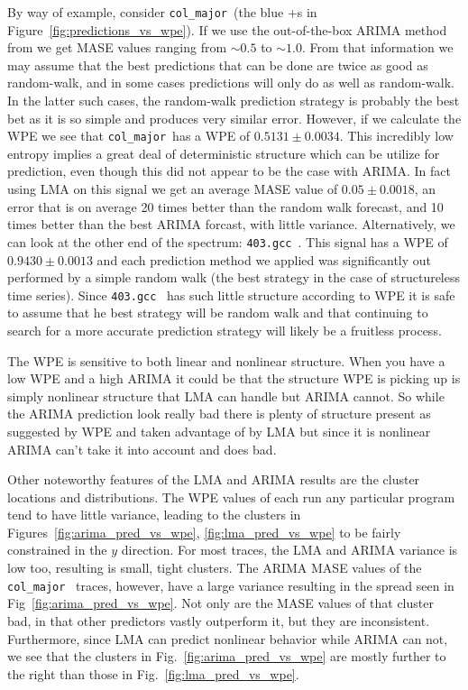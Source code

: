 \documentclass{article}
\newcommand{\gcc}{{\tt 403.gcc}~}
\newcommand{\col}{{\tt col\_major}~}
\begin{document}
By way of example, consider \col (the blue +s in
Figure~\ref{fig:predictions_vs_wpe}). If we use the out-of-the-box ARIMA method
from \cite{ARIMA-autofit} we get MASE values ranging from $\sim0.5$ to
$\sim1.0$. From that information we may assume that the best predictions that
can be done are twice as good as random-walk, and in some cases predictions will
only do as well as random-walk. In the latter such cases, the random-walk
prediction strategy is probably the best bet as it is so simple and produces
very similar error. However, if we calculate the WPE we see that \col has a WPE
of $0.5131 \pm 0.0034$. This incredibly low entropy implies a great deal of
deterministic structure which can be utilize for prediction, even though this
did not appear to be the case with ARIMA. In fact using LMA on this signal we
get an average MASE value of $0.05\pm0.0018$, an error that is on average 20
times better than the random walk forecast, and 10 times better than the best
ARIMA forcast, with little variance. Alternatively, we can look at the other end
of the spectrum: \gcc. This signal has a WPE of $0.9430\pm0.0013$ and each
prediction method we applied was significantly out performed by a simple random
walk (the best strategy in the case of structureless time series). Since \gcc
has such little structure according to WPE it is safe to assume that he best
strategy will be random walk and that continuing to search for a more accurate
prediction strategy will likely be a fruitless process.

The WPE is sensitive to both linear and nonlinear structure. When you have a low
WPE and a high ARIMA it could be that the structure WPE is picking up is simply
nonlinear structure that LMA can handle but ARIMA cannot. So while the ARIMA
prediction look really bad there is plenty of structure present as suggested by
WPE and taken advantage of by LMA but since it is nonlinear ARIMA can't take it
into account and does bad.

Other noteworthy features of the LMA and ARIMA results are the cluster locations
and distributions. The WPE values of each run any particular program tend to
have little variance, leading to the clusters in
Figures~\ref{fig:arima_pred_vs_wpe}, \ref{fig:lma_pred_vs_wpe} to be fairly
constrained in the $y$ direction. For most traces, the LMA and ARIMA variance is
low too, resulting is small, tight clusters. The ARIMA MASE values of the \col
traces, however, have a large variance resulting in the spread seen in
Fig~\ref{fig:arima_pred_vs_wpe}. Not only are the MASE values of that cluster
bad, in that other predictors vastly outperform it, but they are inconsistent.
Furthermore, since LMA can predict nonlinear behavior while ARIMA can not, we
see that the clusters in Fig.~\ref{fig:arima_pred_vs_wpe} are mostly further to
the right than those in Fig.~\ref{fig:lma_pred_vs_wpe}.
\end{document}
